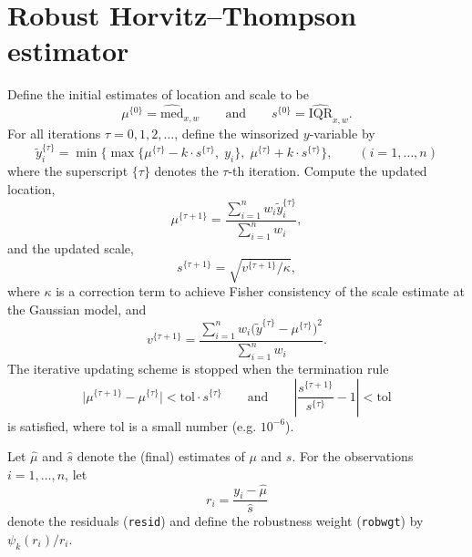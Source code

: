 \documentclass[a4paper,11pt]{scrreprt}
\begin{document}
\chapter{Robust Horvitz--Thompson estimator}\label{ch:ht}
Define the initial estimates of location and scale to be
\begin{equation*}
   \mu^{\{0\}} = \widehat{\mathrm{med}}_{x,w} \qquad \text{and} \qquad s^{\{0\}} = \widehat{\mathrm{IQR}}_{x,w}.
\end{equation*}
\noindent For all iterations $\tau=0,1,2, \ldots$, define the winsorized $y$-variable by
\begin{equation*}
   \tilde{y}_i^{\{\tau\}} = \min\big\{ \max\big\{ \mu^{\{\tau\}} - k \cdot s^{\{\tau\}}, \; y_i \big\},\; \mu^{\{\tau\}} + k \cdot s^{\{\tau\}} \big\}, \qquad (i=1,\ldots,n)
\end{equation*}
\noindent where the superscript $\{\tau\}$ denotes the $\tau$-th iteration. Compute the updated location, 
\begin{equation*}
   \mu^{\{\tau + 1\}} = \frac{\sum_{i=1}^n w_i \tilde{y}_i^{\{\tau\}} }{\sum_{i=1}^n w_i},
\end{equation*}
\noindent and the updated scale,
\begin{equation*}
   s^{\{\tau + 1\}} = \sqrt{v^{\{\tau + 1\}}/\kappa},
\end{equation*}
\noindent where  $\kappa$ is a correction term to achieve Fisher consistency of the scale estimate at the Gaussian model, and
\begin{equation*}
   v^{\{\tau + 1\}} = \frac{\sum_{i=1}^n w_i \big(\tilde{y}^{\{\tau\}} - \mu^{\{\tau\}}\big)^2}{\sum_{i=1}^n w_i}.
\end{equation*}
\noindent The iterative updating scheme is stopped when the termination rule
\begin{equation*}
   \Big\vert \mu^{\{\tau + 1\}} - \mu^{\{\tau\}} \Big\vert  < \mathrm{tol} \cdot s^{\{\tau\}} \qquad \text{and} \qquad \left\vert \frac{s^{\{\tau + 1\}}}{s^{\{\tau\}}} - 1 \right\vert < \mathrm{tol}
\end{equation*}
\noindent is satisfied, where $\mathrm{tol}$ is a small number (e.g. $10^{-6}$). 

Let $\hat{\mu}$ and $\hat{s}$ denote the (final) estimates of $\mu$ and $s$. For the observations $i=1,\ldots,n$, let  
\begin{equation*}
   r_i = \frac{y_i - \hat{\mu}}{\hat{s}}
\end{equation*}
\noindent denote the residuals (\texttt{resid}) and define the robustness weight (\texttt{robwgt}) by $\psi_k(r_i)/r_i$. 
\end{document}
